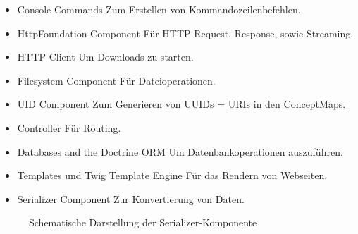 \begin{itemize}
\item Console Commands \cite{symfony-command}\newline Zum Erstellen von Kommandozeilenbefehlen.
\item HttpFoundation Component \cite{symfony-http}\newline Für HTTP Request, Response, sowie Streaming. 
\item HTTP Client \cite{symfony-client}\newline Um Downloads zu starten. 
\item Filesystem Component \cite{symfony-file} \newline Für Dateioperationen. 
\item UID Component \cite{symfony-uuid} \newline Zum Generieren von UUIDs = URIs in den ConceptMaps. 
\item Controller \cite{symfony-controller} \newline Für Routing. 
\item Databases and the Doctrine ORM \cite{symfony-db} \newline Um Datenbankoperationen auszuführen.
\item Templates \cite{symfony-templates} und Twig Template Engine \cite{twig} \newline Für das Rendern von Webseiten.
\item Serializer Component \cite{symfony-serializer} \newline Zur Konvertierung von Daten. 
\end{itemize}

\begin{figure}[H]
    \centering
    \setlength{\fboxsep}{10pt}\color{black!20}
    \normalcolor\caption{Schematische Darstellung der Serializer-Komponente \cite{symfony-serializer}}
\end{figure}

